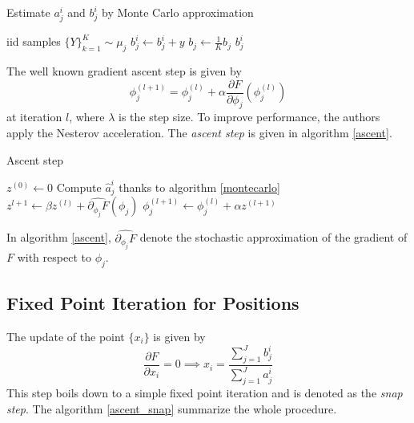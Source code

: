 \begin{algorithm}[H]
    \caption{Estimate $a_j^i$ and $b_j^i$ by Monte Carlo approximation}\label{montecarlo}
    \begin{algorithmic}[1] %
        \REQUIRE iid samples $\lbrace Y\rbrace_{k=1}^K \sim \mu_j$ 
                \STATE $b_j^i \gets b_j^i + y$
            \ENDIF 
        \ENDFOR
        \STATE $b_j \gets \frac{1}{K} b_j$
        \RETURN $b_j^i$
    \end{algorithmic}
\end{algorithm}

The well known gradient ascent step is given by $$ \phi_j^{(l+1)} = \phi_j^{(l)} + \alpha \frac{\partial F}{\partial \phi_j}(\phi_j^{(l)}) $$
at iteration $l$, where $\lambda$ is the step size. To improve performance, the authors apply the Nesterov acceleration. The \textit{ascent step} is given in algorithm \ref{ascent}.

\begin{algorithm}[H]
    \caption{Ascent step}\label{ascent}
    \begin{algorithmic}[1]
        \STATE $z^{(0)} \gets 0$
        \STATE Compute $\hat{a}_j^i$ thanks to algorithm \ref{montecarlo}
        \STATE $z^{l+1} \gets \beta z^{(l)} + \widehat{\partial_{\phi_j}F}(\phi_j)$ 
        \STATE $\phi_j^{(l+1)} \gets \phi_j^{(l)} + \alpha z^{(l+1)}$
        \ENDWHILE
        \ENDFOR
    \end{algorithmic}
\end{algorithm}
In algorithm \ref{ascent}, $\widehat{\partial_{\phi_j}F}$ denote the stochastic approximation of the gradient of $F$ with respect to $\phi_j$. 

\subsection{Fixed Point Iteration for Positions}

The update of the point $\lbrace x_i \rbrace$ is given by 
$$
\frac{\partial F}{\partial x_i} = 0 \implies x_i = \frac{\sum_{j=1}^J b_j^i }{\sum_{j=1}^{J}a_j^i}
$$
This step boils down to a simple fixed point iteration and is denoted as the \textit{snap step}.
The algorithm \ref{ascent_snap} summarize the whole procedure. 

